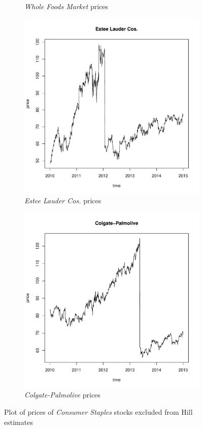 \documentclass{article}
\begin{document}
\begin{figure}[htb!]
\begin{subfigure}{0.45\textwidth}
    \caption{{\it Whole Foods Market} prices}
    \label{fig:WFM_prices}
  \end{subfigure}
  \begin{subfigure}{0.45\textwidth}
    \includegraphics[width=\textwidth]{EL_price.pdf}
    \caption{{\it Estee Lauder Cos.} prices}    
    \label{fig:EL_prices}
  \end{subfigure}
  \begin{subfigure}{0.45\textwidth}
    \includegraphics[width=\textwidth]{CL_price.pdf}
    \caption{{\it Colgate-Palmolive} prices}    
    \label{fig:CL_prices}
  \end{subfigure}
  \caption{Plot of prices of {\it Consumer Staples} stocks
    excluded from Hill estimates}
\end{figure}
\end{document}
